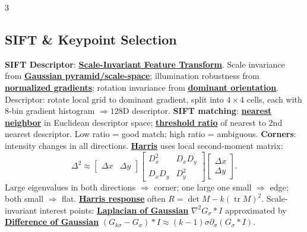 \documentclass{article}
\numberwithin{equation}{subsection}
\newcommand{\key}[1]{\textbf{#1}}
\newcommand{\lowterm}[1]{\textbf{\underline{#1}}}
\begin{document}
\begin{multicols*}{3}
\subsection{SIFT \& Keypoint Selection}
\key{SIFT Descriptor}: \lowterm{Scale-Invariant Feature Transform}. Scale invariance from \lowterm{Gaussian pyramid/scale-space}; illumination robustness from \lowterm{normalized gradients}; rotation invariance from \lowterm{dominant orientation}. Descriptor: rotate local grid to dominant gradient, split into $4\times4$ cells, each with 8-bin gradient histogram $\Rightarrow128$D descriptor.
\key{SIFT matching}: \lowterm{nearest neighbor} in Euclidean descriptor space; \lowterm{threshold ratio} of nearest to 2nd nearest descriptor. Low ratio = good match; high ratio = ambiguous.
\key{Corners}: intensity changes in all directions. \lowterm{Harris} uses local second-moment matrix:
\[
\Delta^2\approx
\begin{bmatrix}\Delta x&\Delta y\end{bmatrix}
\begin{bmatrix}D_x^2&D_xD_y\\D_xD_y&D_y^2\end{bmatrix}
\begin{bmatrix}\Delta x\\\Delta y\end{bmatrix}.
\]
Large eigenvalues in both directions $\Rightarrow$ corner; one large one small $\Rightarrow$ edge; both small $\Rightarrow$ flat. \lowterm{Harris response} often $R=\det M-k(\operatorname{tr}M)^2$. Scale-invariant interest points: \lowterm{Laplacian of Gaussian} $\nabla^2G_\sigma*I$ approximated by \lowterm{Difference of Gaussian} $(G_{k\sigma}-G_\sigma)*I\approx (k-1)\sigma\partial_\sigma(G_\sigma*I)$.


\end{multicols*}
\end{document}
